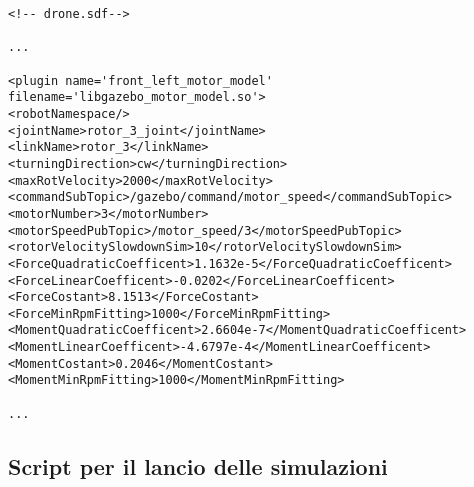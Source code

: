 \lstset{language=XML}
\begin{lstlisting}
<!-- drone.sdf-->

...

<plugin name='front_left_motor_model' filename='libgazebo_motor_model.so'>
<robotNamespace/>
<jointName>rotor_3_joint</jointName>
<linkName>rotor_3</linkName>
<turningDirection>cw</turningDirection>
<maxRotVelocity>2000</maxRotVelocity>
<commandSubTopic>/gazebo/command/motor_speed</commandSubTopic>
<motorNumber>3</motorNumber>
<motorSpeedPubTopic>/motor_speed/3</motorSpeedPubTopic>
<rotorVelocitySlowdownSim>10</rotorVelocitySlowdownSim>
<ForceQuadraticCoefficent>1.1632e-5</ForceQuadraticCoefficent>
<ForceLinearCoefficent>-0.0202</ForceLinearCoefficent>
<ForceCostant>8.1513</ForceCostant>
<ForceMinRpmFitting>1000</ForceMinRpmFitting>
<MomentQuadraticCoefficent>2.6604e-7</MomentQuadraticCoefficent>
<MomentLinearCoefficent>-4.6797e-4</MomentLinearCoefficent>
<MomentCostant>0.2046</MomentCostant>
<MomentMinRpmFitting>1000</MomentMinRpmFitting>

...

\end{lstlisting}

\subsection{Script per il lancio delle simulazioni}

